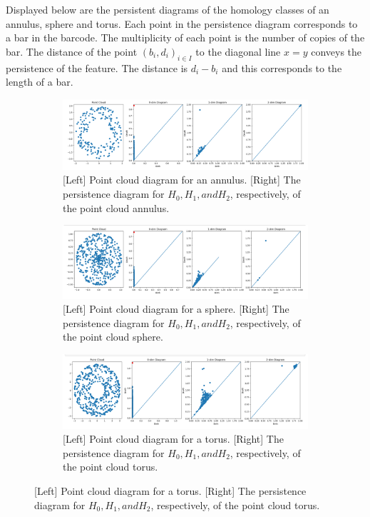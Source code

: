 \documentclass{article}
\begin{document}
Displayed below are the persistent diagrams of the homology classes of an annulus, sphere and torus. Each point in the persistence diagram corresponds to a bar in the barcode. The multiplicity of each point is the number of copies of the bar. The distance of the point $(b_i,d_i)_{i \in I}$ to the diagonal line $x=y$ conveys the persistence of the feature. The distance is $d_i - b_i$ and this corresponds to the length of a bar.


\begin{figure}[h!]
  \centering
  \begin{subfigure}{0.8\textwidth}
    \centering
    \includegraphics[width=1\linewidth]{Annulus_pt cloud, D-B diagram.png}
    \caption{[Left] Point cloud diagram for an annulus. [Right] The persistence diagram for $H_0, H_1, and H_2$, respectively, of the point cloud annulus.}
    \label{fig:Point cloud of annulus with persistence diagrams for 0,1,2 dimensional persistent homology groups}
  \end{subfigure}
  \begin{subfigure}{0.8\textwidth}
    \centering
    \includegraphics[width=1\linewidth]{Sphere_pt cloud, D-B diagram.png}
    \caption{[Left] Point cloud diagram for a sphere. [Right] The persistence diagram for $H_0, H_1, and H_2$, respectively, of the point cloud sphere.}
    \label{fig:Point cloud of sphere with persistence diagrams for 0,1,2 dimensional persistent homology groups}
    \end{subfigure}
  \begin{subfigure}{0.8\textwidth}
    \centering
    \includegraphics[width =1 \linewidth]{Torus_pt cloud, D-B diagram.png}
    \caption{[Left] Point cloud diagram for a torus. [Right] The persistence diagram for $H_0, H_1, and H_2$, respectively, of the point cloud torus.}
    \label{fig:Point cloud of Torus with persistence diagrams for 0,1,2 dimensional persistent homology groups}
  \end{subfigure}  
\end{figure}
\end{document}
